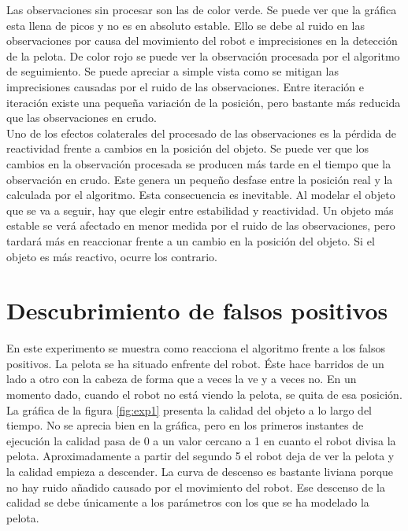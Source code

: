 Las observaciones sin procesar son las de color verde. Se puede ver que la gráfica esta llena de picos y no es en absoluto estable. Ello se debe al ruido en las observaciones por causa del movimiento del robot e imprecisiones en la detección de la pelota. De color rojo se puede ver la observación procesada por el algoritmo de seguimiento. Se puede apreciar a simple vista como se mitigan las imprecisiones causadas por el ruido de las observaciones. Entre iteración e iteración existe una pequeña variación de la posición, pero bastante más reducida que las observaciones en crudo. \\

Uno de los efectos colaterales del procesado de las observaciones es la pérdida de reactividad frente a cambios en la posición del objeto. Se puede ver que los cambios en la observación procesada se producen más tarde en el tiempo que la observación en crudo. Este genera un pequeño desfase entre la posición real y la calculada por el algoritmo. Esta consecuencia es inevitable. Al modelar el objeto que se va a seguir, hay que elegir entre estabilidad y reactividad. Un objeto más estable se verá afectado en menor medida por el ruido de las observaciones, pero tardará más en reaccionar frente a un cambio en la posición del objeto. Si el objeto es más reactivo, ocurre los contrario. \\

\section{Descubrimiento de falsos positivos}
\label{sec:experimentofalsospositivos}

En este experimento se muestra como reacciona el algoritmo frente a los falsos positivos. La pelota se ha situado enfrente del robot. Éste hace barridos de un lado a otro con la cabeza de forma que a veces la ve y a veces no. En un momento dado, cuando el robot no está viendo la pelota, se quita de esa posición. \\

La gráfica de la figura \ref{fig:exp1} presenta la calidad del objeto a lo largo del tiempo. No se aprecia bien en la gráfica, pero en los primeros instantes de ejecución la calidad pasa de 0 a un valor cercano a 1 en cuanto el robot divisa la pelota. Aproximadamente a partir del segundo 5 el robot deja de ver la pelota y la calidad empieza a descender. La curva de descenso es bastante liviana porque no hay ruido añadido causado por el movimiento del robot. Ese descenso de la calidad se debe únicamente a los parámetros con los que se ha modelado la pelota. \\


